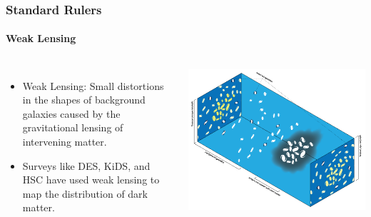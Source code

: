 \documentclass[aspectratio=169]{beamer}
\begin{document}
\begin{frame}
    \frametitle{Standard Rulers}
    \framesubtitle{Weak Lensing}
    \begin{columns}
        \begin{itemize}
            \item<1-> Weak Lensing:  Small distortions in the shapes of background galaxies caused by the gravitational lensing of intervening matter.
            \item<1-> Surveys like DES, KiDS, and HSC have used weak lensing to map the distribution of dark matter. \hfill {}
        \end{itemize}
        \includegraphics[width=\textwidth]{figures/weak_lensing.png}
    \end{columns}
\end{frame}
\end{document}
